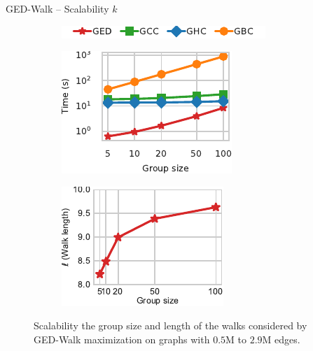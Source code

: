 \documentclass[10pt,titlepage,english,presentation]{beamer}
\begin{document}
\begin{frame}[t]{GED-Walk -- Scalability \wrt $k$}
\begin{figure}
\begin{subfigure}[t]{\textwidth}
\centering
\includegraphics[width=.5\textwidth]{../sources/plots/ged-walk/legend-ged-time-vs-group.pdf}
\end{subfigure}\smallskip

\begin{subfigure}[t]{.5\textwidth}
\centering
\includegraphics[width=.8\textwidth]{../sources/plots/ged-walk/ged-time-vs-group.pdf}
\end{subfigure}\hfill
\begin{subfigure}[t]{.5\textwidth}
\centering
\includegraphics[width=.8\textwidth]{../sources/plots/ged-walk/scalability-walk-length.pdf}
\end{subfigure}
\caption*{\footnotesize Scalability \wrt the group size and length of the walks
considered by GED-Walk maximization on graphs with $0.5$M to $2.9$M edges.}
\end{figure}
\end{frame}
\end{document}
